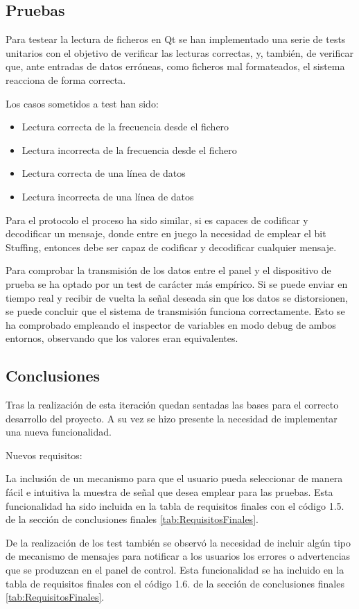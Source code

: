     \subsection{Pruebas}

        Para testear la lectura de ficheros en Qt se han implementado una serie de tests unitarios con el objetivo de verificar las lecturas correctas, y, también, de verificar que, ante entradas de datos erróneas, como ficheros mal formateados, el sistema reacciona de forma correcta.

        Los casos sometidos a test han sido:

        \begin{itemize}
                \item Lectura correcta de la frecuencia desde el fichero
                \item Lectura incorrecta de la frecuencia desde el fichero
                \item Lectura correcta de una línea de datos
                \item Lectura incorrecta de una línea de datos
        \end{itemize}

        Para el protocolo el proceso ha sido similar, si es capaces de codificar y decodificar un mensaje, donde entre en juego la necesidad de emplear el bit Stuffing, entonces debe ser capaz de codificar y decodificar cualquier mensaje.

        Para comprobar la transmisión de los datos entre el panel y el dispositivo de prueba se ha optado por un test de carácter más empírico. Si se puede enviar en tiempo real y recibir de vuelta la señal deseada sin que los datos se distorsionen, se puede concluir que el sistema de transmisión funciona correctamente. Esto se ha comprobado empleando el inspector de variables en modo debug de ambos entornos, observando que los valores eran equivalentes.

    \subsection{Conclusiones}

        Tras la realización de esta iteración quedan sentadas las bases para el correcto desarrollo del proyecto. A su vez se hizo presente la necesidad de implementar una nueva funcionalidad.

        Nuevos requisitos:

        La inclusión de un mecanismo para que el usuario pueda seleccionar de manera fácil e intuitiva la muestra de señal que desea emplear para las pruebas. Esta funcionalidad ha sido incluida en la tabla de requisitos finales con el código 1.5. de la sección de conclusiones finales \ref{tab:RequisitosFinales}.

        De la realización de los test también se observó la necesidad de incluir algún tipo de mecanismo de mensajes para notificar a los usuarios los errores o advertencias que se produzcan en el panel de control. Esta funcionalidad se ha incluido en la tabla de requisitos finales con el código 1.6. de la sección de conclusiones finales \ref{tab:RequisitosFinales}. 
        